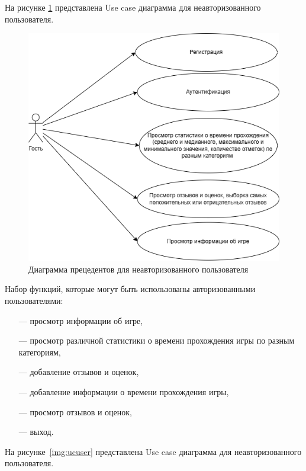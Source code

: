 На рисунке \ref{img:ucguest} представлена Use case диаграмма для неавторизованного пользователя.
\begin{figure}[H]
	\begin{center}
		\includegraphics[scale=0.8]{../imgs/guest.png}
	\end{center}
	\captionsetup{justification=centering}
	\caption{Диаграмма прецедентов для неавторизованного пользователя}
	\label{img:ucguest}
\end{figure}
	
Набор функций, которые могут быть использованы авторизованными пользователями:
	\begin{itemize}
		\item[---] просмотр информации об игре,
		\item[---] просмотр различной статистики о времени прохождения игры по разным категориям,
		\item[---] добавление отзывов и оценок,
		\item[---] добавление информации о времени прохождения игры,
		\item[---] просмотр отзывов и оценок,	
		\item[---] выход. 
	\end{itemize}

На рисунке~\ref{img:ucuser} представлена Use case диаграмма для неавторизованного пользователя.

